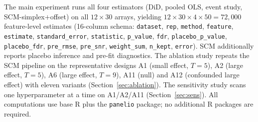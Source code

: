 \documentclass[11pt]{article}
\begin{document}
The main experiment runs all four estimators (DiD, pooled OLS, event study, SCM-simplex$+$offset) on
all $12\times30$ arrays, yielding $12\times30\times4\times50=72{,}000$ feature-level estimates
(16-column schema: \texttt{dataset}, \texttt{rep}, \texttt{method}, \texttt{feature}, \texttt{estimate}, \texttt{standard\_error}, \texttt{statistic}, \texttt{p\_value}, \texttt{fdr}, \texttt{placebo\_p\_value}, \texttt{placebo\_fdr}, \texttt{pre\_rmse}, \texttt{pre\_snr}, \texttt{weight\_sum}, \texttt{n\_kept}, \texttt{error}). SCM additionally
reports placebo inference and pre-fit diagnostics. The ablation study repeats the SCM pipeline on the
representative designs A1 (small effect, $T{=}5$), A2 (large effect, $T{=}5$), A6 (large effect,
$T{=}9$), A11 (null) and A12 (confounded large effect) with eleven variants
(Section~\ref{sec:ablation}). The sensitivity study scans one hyperparameter at a time on
A1/A2/A11 (Section~\ref{sec:sens}). All computations use base R plus the \texttt{panelio} package;
no additional R packages are required.
\end{document}
